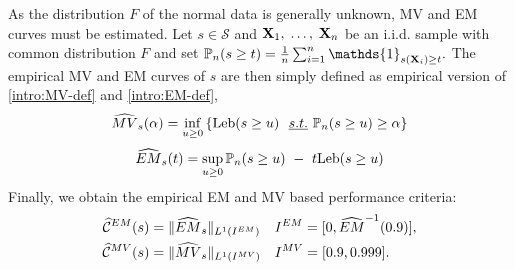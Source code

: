As the distribution $F$ of the normal data is generally unknown, MV and EM curves must be estimated. Let $s\in \mathcal{S}$ and $\mathbf X_1,\; \ldots,\; \mathbf X_n$ be an i.i.d. sample with common distribution $F$ and set $\mathbb{P}_n(s \ge t)=\frac{1}{n}\sum_{i=1}^n\mathds{1}_{s(\mb X_i)\geq t}.$ The empirical MV and EM curves of $s$ are then simply defined as empirical version of \eqref{intro:MV-def} and \eqref{intro:EM-def}, 
\begin{align}
\label{resume_fr:MV-def-emp}
\widehat{MV}_s(\alpha) = \inf_{u \ge 0} \left\{ \text{Leb}(s \ge u) ~~\emph{s.t.}{}~ \mathbb{P}_n(s \ge u) \ge \alpha \right\}
\end{align}
\begin{align}
\label{resume_fr:EM-def-emp}
\widehat{EM}_s(t) = \sup_{u \ge 0} \mathbb{P}_n(s \ge u) ~-~ t \text{Leb}(s \ge u)
\end{align}
%
%
Finally, we obtain the empirical EM and MV based performance criteria:
\begin{align}
\label{resume_fr:eq:standard_emp_EM}\widehat{\mathcal{C}}^{EM}(s) &= \| \widehat{EM}_s \|_{L^1(I^{EM})}  &&I^{EM} = [0,\widehat{EM}^{-1}(0.9)],\\
\label{resume_fr:eq:standard_emp_MV}\widehat{\mathcal{C}}^{MV}(s) &= \| \widehat{MV}_s \|_{L^1(I^{MV})}  &&I^{MV} = [0.9, 0.999].
\end{align}
%

